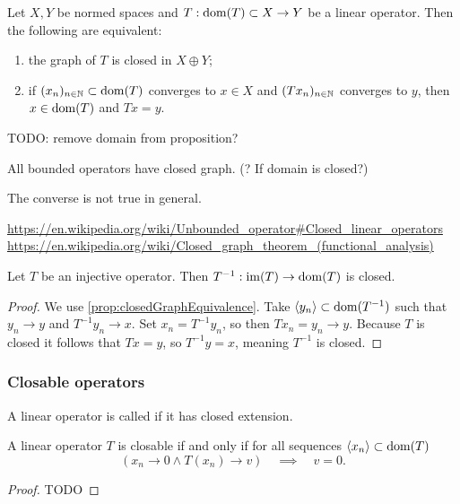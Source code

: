\begin{proposition} \label{prop:closedGraphEquivalence}
Let $X,Y$ be normed spaces and $T: \operatorname{dom}(T)\subset X \to Y$ be a linear operator. Then
the following are equivalent:
\begin{enumerate}
\item the graph of $T$ is closed in $X\oplus Y$;
\item if $(x_n)_{n\in\mathbb{N}}\subset \operatorname{dom}(T)$ converges to $x\in X$ and $(Tx_n)_{n\in\mathbb{N}}$ converges to $y$, then $x\in\operatorname{dom}(T)$ and $Tx = y$.
\end{enumerate}
\end{proposition}
TODO: remove domain from proposition?
\begin{corollary}
All bounded operators have closed graph. (? If domain is closed?)
\end{corollary}
The converse is not true in general.

\url{https://en.wikipedia.org/wiki/Unbounded_operator#Closed_linear_operators}
\url{https://en.wikipedia.org/wiki/Closed_graph_theorem_(functional_analysis)}

\begin{proposition}
Let $T$ be an injective operator. Then $T^{-1}: \operatorname{im}(T) \to \operatorname{dom}(T)$ is closed.
\end{proposition}
\begin{proof}
We use \ref{prop:closedGraphEquivalence}. Take $\langle y_n \rangle\subset \operatorname{dom}(T^{-1})$ such that $y_n\to y$ and $T^{-1}y_n\to x$. Set $x_n = T^{-1}y_n$, so then $Tx_n = y_n\to y$. Because $T$ is closed it follows that $Tx = y$, so $T^{-1}y = x$, meaning $T^{-1}$ is closed.
\end{proof}

\subsubsection{Closable operators}
\begin{definition}
A linear operator is called  if it has closed extension.
\end{definition}

\begin{proposition}
A linear operator $T$ is closable \textup{if and only if} for all sequences $\langle x_n \rangle\subset\operatorname{dom}(T)$
\[ \left(x_n\to 0 \land T(x_n)\to v\right) \quad\implies\quad v = 0. \]
\end{proposition}
\begin{proof}
TODO
\end{proof}

